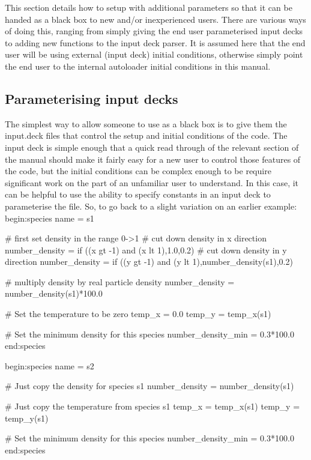 \documentclass[12pt,a4paper]{article}
\newcommand{\EPOCH}{{\color{warwickdark}\fontfamily{phv}\selectfont{EPOCH}}}
\newenvironment{boxverbatim}{\lboxverbatim{none}}{\endlboxverbatim}
\begin{document}
This section details how to setup {\EPOCH} with additional parameters so that
it can be handed as a black box to new and/or inexperienced users. There are
various ways of doing this, ranging from simply giving the end user
parameterised input decks to adding new functions to the input deck parser. It
is assumed here that the end user will be using external (input deck) initial
conditions, otherwise simply point the end user to the internal autoloader
initial conditions in this manual.

\subsection{Parameterising input decks}
The simplest way to allow someone to use {\EPOCH} as a black box is to give them
the input.deck files that control the setup and initial conditions
of the code. The input deck is simple enough that a quick read through of the
relevant section of the manual should make it fairly easy for a new user to
control those features of the code, but the initial conditions can be complex
enough to be require significant work on the part of an unfamiliar user to
understand. In this case, it can be helpful to use the ability to specify
constants in an input deck to parameterise the file. So, to go back to a slight
variation on an earlier example:
\begin{boxverbatim}
begin:species
   name = s1

   # first set density in the range 0->1
   # cut down density in x direction
   number_density = if ((x gt -1) and (x lt 1),1.0,0.2)
   # cut down density in y direction
   number_density = if ((y gt -1) and (y lt 1),number_density(s1),0.2)

   # multiply density by real particle density
   number_density = number_density(s1)*100.0

   # Set the temperature to be zero
   temp_x = 0.0
   temp_y = temp_x(s1)

   # Set the minimum density for this species
   number_density_min = 0.3*100.0
end:species

begin:species
   name = s2

   # Just copy the density for species s1
   number_density = number_density(s1)

   # Just copy the temperature from species s1
   temp_x = temp_x(s1)
   temp_y = temp_y(s1)

   # Set the minimum density for this species
   number_density_min = 0.3*100.0
end:species
\end{boxverbatim}
\end{document}
